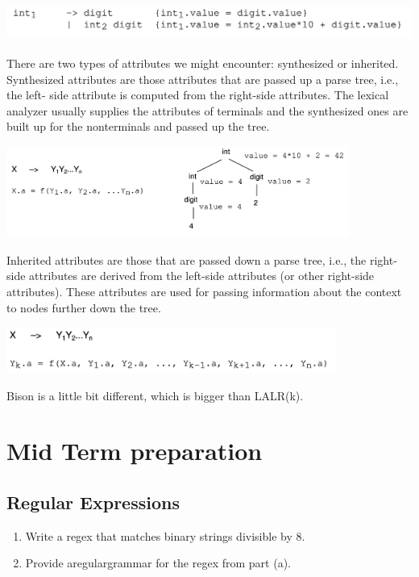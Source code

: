 \documentclass[a4paper]{article}
\theoremstyle{definition}
\begin{document}
  \begin{center}
    \includegraphics[height=1.2cm]{img/Snipaste_2021-04-12_17-42-34.png}
    \end{center}
    
    There are two types of attributes we might encounter: synthesized or inherited. Synthesized attributes are those attributes that are passed up a parse tree, i.e., the left-
    side attribute is computed from the right-side attributes. The lexical analyzer usually supplies the attributes of terminals and the synthesized ones are built up for the nonterminals and passed up the tree.
    
    \begin{center}
      \includegraphics[height=3cm]{img/Snipaste_2021-04-12_17-43-29.png}
      \end{center}
      
      Inherited attributes are those that are passed down a parse tree, i.e., the right-side attributes are derived from the left-side attributes (or other right-side attributes). These attributes are used for passing information about the context to nodes further down the tree.
      \begin{center}
        \includegraphics[height=1.5cm]{img/Snipaste_2021-04-12_17-44-09.png}
        \end{center}
Bison is a little bit different, which is bigger than LALR(k).


\section{Mid Term preparation}
\subsection{Regular Expressions}
\begin{enumerate}
   \item Write a regex that matches binary strings divisible by 8.
   \item Provide aregulargrammar for the regex from part (a).
 \end{enumerate}
\end{document}
